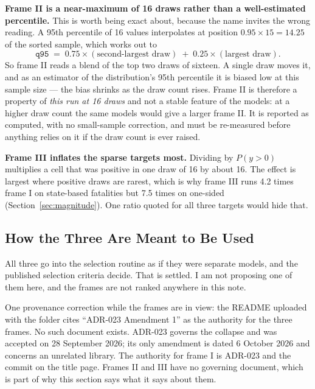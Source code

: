 \textbf{Frame II is a near-maximum of 16 draws rather than a well-estimated percentile.} This is
worth being exact about, because the name invites the wrong reading. A 95th percentile of 16 values
interpolates at position $0.95 \times 15 = 14.25$ of the sorted sample, which works out to
\[
  \texttt{q95} \;=\; 0.75 \times (\text{second-largest draw}) \;+\; 0.25 \times (\text{largest draw}).
\]
So frame II reads a blend of the top two draws of sixteen. A single draw moves it, and as an
estimator of the distribution's 95th percentile it is biased low at this sample size --- the bias
shrinks as the draw count rises. Frame II is therefore a property of \emph{this run at 16 draws}
and not a stable feature of the models: at a higher draw count the same models would give a larger
frame II. It is reported as computed, with no small-sample correction, and must be re-measured
before anything relies on it if the draw count is ever raised.

\textbf{Frame III inflates the sparse targets most.} Dividing by $P(y>0)$ multiplies a cell that
was positive in one draw of 16 by about 16. The effect is largest where positive draws are rarest,
which is why frame III runs 4.2 times frame I on state-based fatalities but 7.5 times on one-sided
(Section~\ref{sec:magnitude}). One ratio quoted for all three targets would hide that.

\subsection*{How the Three Are Meant to Be Used}

All three go into the selection routine as if they were separate models, and the published
selection criteria decide. That is settled. I am not proposing one of them here, and the frames
are not ranked anywhere in this note.

One provenance correction while the frames are in view: the README uploaded with the folder cites
``ADR-023 Amendment 1'' as the authority for the three frames. No such document exists. ADR-023
governs the collapse and was accepted on 28 September 2026; its only amendment is dated 6 October
2026 and concerns an unrelated library. The authority for frame I is ADR-023 and the commit on the
title page. Frames II and III have no governing document, which is part of why this section says
what it says about them.
